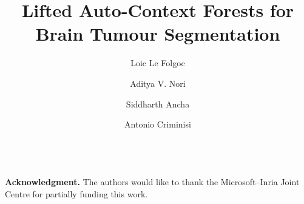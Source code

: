 \documentclass[runningheads,a4paper]{llncs}
\begin{document}
\mainmatter

\title{Lifted Auto-Context Forests for Brain Tumour Segmentation%
}
\titlerunning{Lifted Auto-Context Forests for BRATS%
}

\author{Loic Le Folgoc \and Aditya V. Nori \and Siddharth Ancha \and Antonio Criminisi}

\toctitle{}
\tocauthor{}
\maketitle




\begin{abstract}

\end{abstract}














%



~\. \\
\noindent
\textbf{Acknowledgment.} The authors would like to thank the Microsoft--Inria Joint Centre for partially funding this work.

{\small


}

\appendix
\end{document}
